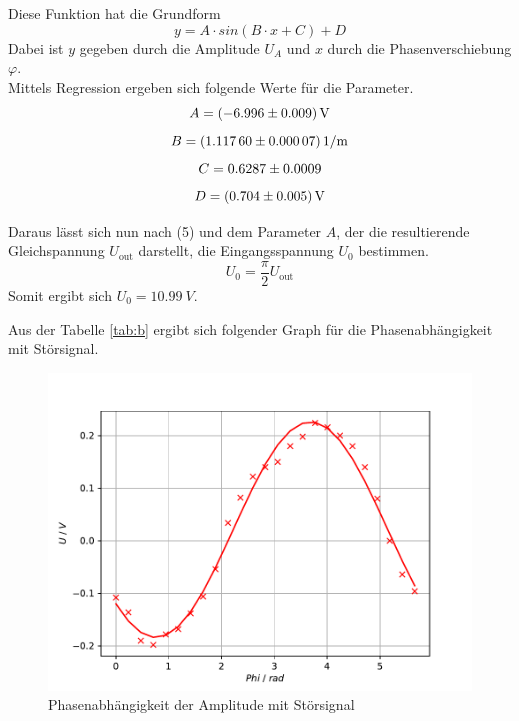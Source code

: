 Diese Funktion hat die Grundform
\begin{equation}
	y = A\cdot sin(B \cdot x + C) + D
\end{equation}
Dabei ist $y$ gegeben durch die Amplitude $U_A$ und $x$ durch die Phasenverschiebung $\varphi$. \\
Mittels Regression ergeben sich folgende Werte für die Parameter.
\begin{equation}
	A = \SI{-6.996 \pm 0.009}{V} \notag
\end{equation}
\begin{equation}
	B = \SI{1.11760 \pm 0.00007}{1/m} \notag
\end{equation}
\begin{equation}
	C = 0.6287 \pm 0.0009 \notag
\end{equation}
\begin{equation}
	D = \SI{0.704 \pm 0.005}{V} \notag
\end{equation}

Daraus lässt sich nun nach (5) und dem Parameter $A$, der die resultierende Gleichspannung $U_\text{out}$ darstellt, die Eingangsspannung $U_0$ bestimmen.
\begin{equation}
	U_0 = \frac{\pi}{2}U_\text{out}
\end{equation}
Somit ergibt sich $U_0 = \SI{10,99}{V}$.

Aus der Tabelle \ref{tab:b} ergibt sich folgender Graph für die Phasenabhängigkeit mit Störsignal.
\begin{figure}[h]
	\centering
	\includegraphics{Sinus2.pdf}
	\caption{Phasenabhängigkeit der Amplitude mit Störsignal}
	\label{fig:sinus2}
\end{figure}

